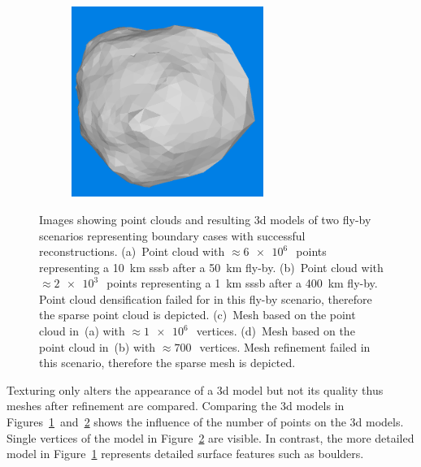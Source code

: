 \begin{figure}[htb]
\begin{subfigure}[b]{0.42\textwidth}
            \caption{} %
            \label{fig:models_50_10}
        \end{subfigure}
        \begin{subfigure}[b]{0.42\textwidth}
            \centering
            \includegraphics[width=\textwidth,height=6.2cm]{doc/thesis/0_figures/models_quality/400_1/120_400_1_mesh2.png}
            \caption{}
            \label{fig:models_400_1}
        \end{subfigure}
    \caption{Images showing point clouds and resulting \gls{3d} models of two fly-by scenarios representing boundary cases with successful reconstructions. (a)~Point cloud with $\approx\SI{6e6}{}$~points representing a \SI{10}{\kilo\meter} \gls{sssb} after a \SI{50}{\kilo\meter} fly-by. (b)~Point cloud with $\approx\SI{2e3}{}$~points representing a \SI{1}{\kilo\meter} \gls{sssb} after a \SI{400}{\kilo\meter} fly-by. Point cloud densification failed for in this fly-by scenario, therefore the sparse point cloud is depicted. (c)~Mesh based on the point cloud in~(a) with $\approx\SI{1e6}{}$~vertices. (d)~Mesh based on the point cloud in~(b) with $\approx\SI{700}{}$~vertices. Mesh refinement failed in this scenario, therefore the sparse mesh is depicted.}
    \label{fig:points_models_comp}
\end{figure}

Texturing only alters the appearance of a \gls{3d} model but not its quality thus meshes after refinement are compared. Comparing the \gls{3d} models in Figures~\ref{fig:models_50_10}~and~\ref{fig:models_400_1} shows the influence of the number of points on the \gls{3d} models. Single vertices of the model in Figure~\ref{fig:models_400_1} are visible. In contrast, the more detailed model in Figure~\ref{fig:models_50_10} represents detailed surface features such as boulders.



